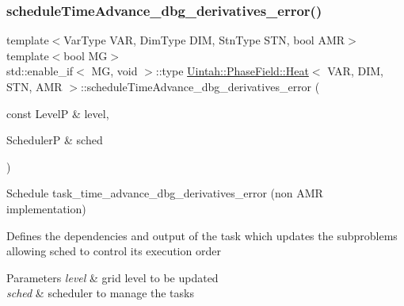 \subsubsection{\texorpdfstring{schedule\+Time\+Advance\+\_\+dbg\+\_\+derivatives\+\_\+error()}{scheduleTimeAdvance\_dbg\_derivatives\_error()}\hspace{0.1cm}{\footnotesize\ttfamily [1/2]}}
{\footnotesize\ttfamily template$<$Var\+Type V\+AR, Dim\+Type D\+IM, Stn\+Type S\+TN, bool A\+MR$>$ \\
template$<$bool MG$>$ \\
std\+::enable\+\_\+if$<$ MG, void $>$\+::type \hyperlink{classUintah_1_1PhaseField_1_1Heat}{Uintah\+::\+Phase\+Field\+::\+Heat}$<$ V\+AR, D\+IM, S\+TN, A\+MR $>$\+::schedule\+Time\+Advance\+\_\+dbg\+\_\+derivatives\+\_\+error (\begin{DoxyParamCaption}\item[{const LevelP \&}]{level,  }\item[{SchedulerP \&}]{sched }\end{DoxyParamCaption})\hspace{0.3cm}{\ttfamily [protected]}}



Schedule task\+\_\+time\+\_\+advance\+\_\+dbg\+\_\+derivatives\+\_\+error (non A\+MR implementation) 

Defines the dependencies and output of the task which updates the subproblems allowing sched to control its execution order


\begin{DoxyParams}{Parameters}
{\em level} & grid level to be updated \\
\hline
{\em sched} & scheduler to manage the tasks \\
\hline
\end{DoxyParams}
\mbox{\label{classUintah_1_1PhaseField_1_1Heat_acc85b548081a60269deee446d0fb0f4b}} 
